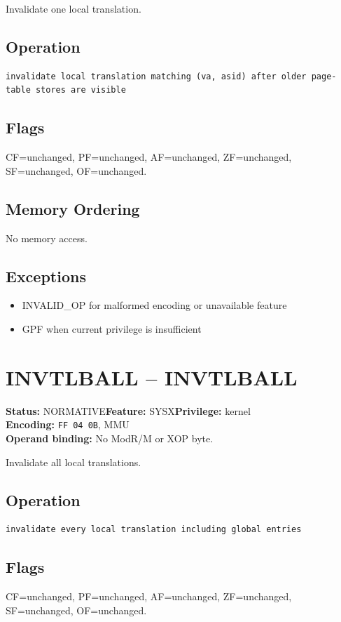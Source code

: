 \documentclass[10pt]{article}
\begin{document}
Invalidate one local translation.

\subsection*{Operation}
\begin{lstlisting}
invalidate local translation matching (va, asid) after older page-table stores are visible
\end{lstlisting}
\subsection*{Flags}
CF=unchanged, PF=unchanged, AF=unchanged, ZF=unchanged, SF=unchanged, OF=unchanged.
\subsection*{Memory Ordering}
No memory access.
\subsection*{Exceptions}
\begin{itemize}
\item INVALID\_OP for malformed encoding or unavailable feature
\item GPF when current privilege is insufficient
\end{itemize}
\clearpage

\section{INVTLBALL -- INVTLBALL}
\textbf{Status:} NORMATIVE\quad \textbf{Feature:} SYSX\quad \textbf{Privilege:} kernel\\
\textbf{Encoding:} \texttt{FF 04 0B}, MMU\\
\textbf{Operand binding:} No ModR/M or XOP byte.

Invalidate all local translations.

\subsection*{Operation}
\begin{lstlisting}
invalidate every local translation including global entries
\end{lstlisting}
\subsection*{Flags}
CF=unchanged, PF=unchanged, AF=unchanged, ZF=unchanged, SF=unchanged, OF=unchanged.
\end{document}

